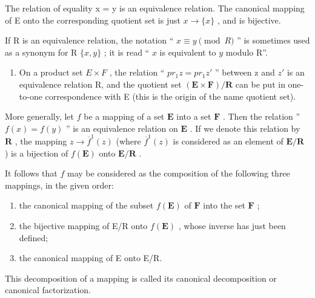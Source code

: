 The relation of equality x = y is an equivalence relation. The canonical mapping of E onto the corresponding quotient set is just \(x \to \{x\}\) , and is bijective.

If R is an equivalence relation, the notation `` \(x \equiv y \pmod{R}\) '' is sometimes used as a synonym for R \(\{x, y\}\) ; it is read `` \(x\) is equivalent to \(y\) modulo R''.

\begin{enumerate}
\def\labelenumi{\arabic{enumi}.}
\setcounter{enumi}{2}
\tightlist
\item
  On a product set \(E \times F\) , the relation `` \(pr_{1}z = pr_{1}z'\) '' between z and \(z'\) is an equivalence relation R, and the quotient set \((\mathbf{E} \times \mathbf{F}) / \mathbf{R}\) can be put in one-to-one correspondence with E (this is the origin of the name quotient set).
\end{enumerate}

More generally, let \(f\) be a mapping of a set \(\mathbf{E}\) into a set \(\mathbf{F}\) . Then the relation '' \(f(x) = f(y)\) '' is an equivalence relation on \(\mathbf{E}\) . If we denote this relation by \(\mathbf{R}\) , the mapping \(z \to \overline{f}^1(z)\) (where \(\overline{f}^1(z)\) is considered as an element of \(\mathbf{E}/\mathbf{R}\) ) is a bijection of \(f(\mathbf{E})\) onto \(\mathbf{E}/\mathbf{R}\) .

It follows that \(f\) may be considered as the composition of the following three mappings, in the given order:

\begin{enumerate}
\def\labelenumi{(\arabic{enumi})}
\item
  the canonical mapping of the subset \(f(\mathbf{E})\) of \(\mathbf{F}\) into the set \(\mathbf{F}\) ;
\item
  the bijective mapping of E/R onto \(f(\mathbf{E})\) , whose inverse has just been defined;
\item
  the canonical mapping of E onto E/R.
\end{enumerate}

This decomposition of a mapping is called its canonical decomposition or canonical factorization.

